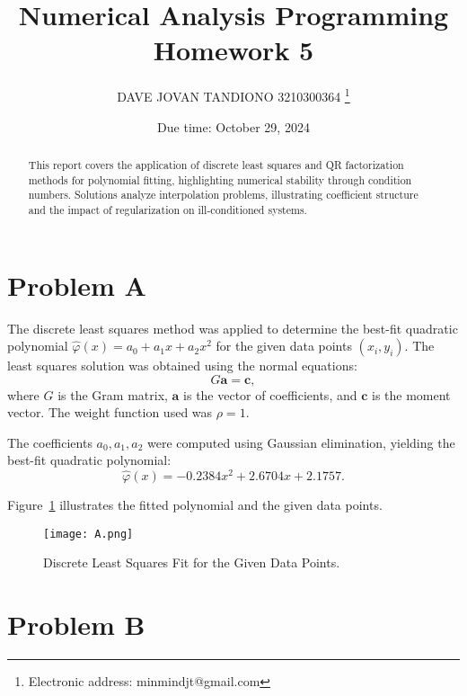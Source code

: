 \documentclass[a4paper]{article}
\begin{document}
\title{Numerical Analysis Programming Homework 5}
\author{DAVE JOVAN TANDIONO 3210300364 \thanks{Electronic address: minmindjt@gmail.com}}
\date{Due time: October 29, 2024}

\maketitle

\begin{abstract}
This report covers the application of discrete least squares and QR factorization methods for polynomial fitting, highlighting numerical stability through condition numbers. Solutions analyze interpolation problems, illustrating coefficient structure and the impact of regularization on ill-conditioned systems.
\end{abstract}



\section*{Problem A}

The discrete least squares method was applied to determine the best-fit quadratic polynomial \( \hat{\varphi}(x) = a_0 + a_1 x + a_2 x^2 \) for the given data points \((x_i, y_i)\). The least squares solution was obtained using the normal equations:
\[
G \mathbf{a} = \mathbf{c},
\]
where \( G \) is the Gram matrix, \( \mathbf{a} \) is the vector of coefficients, and \( \mathbf{c} \) is the moment vector. The weight function used was \( \rho = 1 \).

The coefficients \( a_0, a_1, a_2 \) were computed using Gaussian elimination, yielding the best-fit quadratic polynomial:
\[
\hat{\varphi}(x) = -0.2384 x^2 + 2.6704 x + 2.1757.
\]

Figure~\ref{fig:least_squares} illustrates the fitted polynomial and the given data points. 

\begin{figure}[H]
    \centering
    \texttt{[image: A.png]}
    \caption{Discrete Least Squares Fit for the Given Data Points.}
    \label{fig:least_squares}
\end{figure}

\section*{Problem B}
\end{document}
